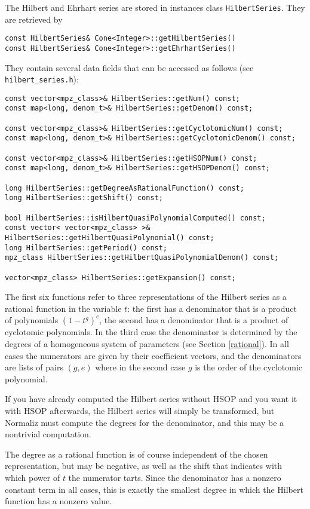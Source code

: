 \documentclass[12pt,a4paper]{scrartcl}
\theoremstyle{definition}
\begin{document}
\begin{small}
The Hilbert and Ehrhart  series are stored in instances class \verb|HilbertSeries|. They are retrieved by
\begin{Verbatim}
const HilbertSeries& Cone<Integer>::getHilbertSeries()
const HilbertSeries& Cone<Integer>::getEhrhartSeries()
\end{Verbatim}
They contain several data fields that can be accessed as follows (see \verb|hilbert_series.h|):
\begin{Verbatim}
const vector<mpz_class>& HilbertSeries::getNum() const;
const map<long, denom_t>& HilbertSeries::getDenom() const;

const vector<mpz_class>& HilbertSeries::getCyclotomicNum() const;
const map<long, denom_t>& HilbertSeries::getCyclotomicDenom() const;

const vector<mpz_class>& HilbertSeries::getHSOPNum() const;
const map<long, denom_t>& HilbertSeries::getHSOPDenom() const;

long HilbertSeries::getDegreeAsRationalFunction() const;
long HilbertSeries::getShift() const;

bool HilbertSeries::isHilbertQuasiPolynomialComputed() const;
const vector< vector<mpz_class> >& HilbertSeries::getHilbertQuasiPolynomial() const;
long HilbertSeries::getPeriod() const;
mpz_class HilbertSeries::getHilbertQuasiPolynomialDenom() const;

vector<mpz_class> HilbertSeries::getExpansion() const;
\end{Verbatim}

The first six functions refer to three representations of the Hilbert series as a rational function in the variable $t$: the first has a denominator that is a product of polynomials $(1-t^g)^e$, the second has a denominator that is a product of cyclotomic polynomials. In the third case the denominator is determined by the degrees of a homogeneous system of parameters (see Section \ref{rational}). In all cases the numerators are given by their coefficient vectors, and the denominators are lists of pairs $(g,e)$ where in the second case $g$ is the order of the cyclotomic polynomial.

If you have already computed the Hilbert series without HSOP and you want it with HSOP afterwards, the Hilbert series will simply be transformed, but Normaliz must compute the degrees for the denominator, and this may be a nontrivial computation.

The degree as a rational function is of course independent of the chosen representation, but may be negative, as well as the shift that indicates with which power of $t$ the numerator tarts. Since the denominator has a nonzero constant term in all cases, this is exactly the smallest degree in which the Hilbert function has a nonzero value.


\end{small}
\end{document}
